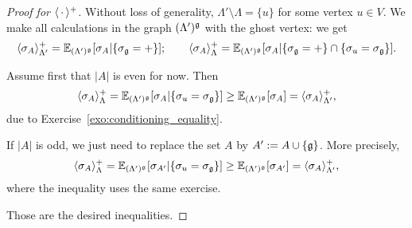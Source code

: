 \begin{proof}[Proof for $\langle\,\cdot\,\rangle^+$]
    Without loss of generality,
    $\Lambda'\setminus\Lambda=\{u\}$ for some
    vertex $u\in V$.
    We make all calculations in the graph $(\Lambda')^\mathfrak g$ with the ghost vertex:
    we get
    \[
        \langle\sigma_A\rangle_{\Lambda'}^+
        =
        \mathbb E_{(\Lambda')^\mathfrak g}[\sigma_A|\{\sigma_\mathfrak g=+\}];
        \qquad
        \langle\sigma_A\rangle_{\Lambda}^+
        =
        \mathbb E_{(\Lambda')^\mathfrak g}[\sigma_A|\{\sigma_\mathfrak g=+\}\cap\{\sigma_u=\sigma_\mathfrak g\}].
    \]

    Assume first that $|A|$ is even for now.
    Then
    \begin{equation}
        \langle\sigma_A\rangle_{\Lambda}^+
        =
        \mathbb E_{(\Lambda')^\mathfrak g}[\sigma_A|\{\sigma_u=\sigma_\mathfrak g\}]
        \geq
        \mathbb E_{(\Lambda')^\mathfrak g}[\sigma_A]
        =
        \langle\sigma_A\rangle_{\Lambda'}^+,
    \end{equation}
    due to Exercise~\ref{exo:conditioning_equality}.

    If $|A|$ is odd, we just need to replace the set $A$
    by $A':=A\cup\{\mathfrak g\}$.
    More precisely,
    \begin{equation}
        \langle\sigma_A\rangle_{\Lambda}^+
        =
        \mathbb E_{(\Lambda')^\mathfrak g}[\sigma_{A'}|\{\sigma_u=\sigma_\mathfrak g\}]
        \geq
        \mathbb E_{(\Lambda')^\mathfrak g}[\sigma_{A'}]
        =
        \langle\sigma_A\rangle_{\Lambda'}^+,
    \end{equation}
    where the inequality uses the same exercise.

    Those are the desired inequalities.
\end{proof}

